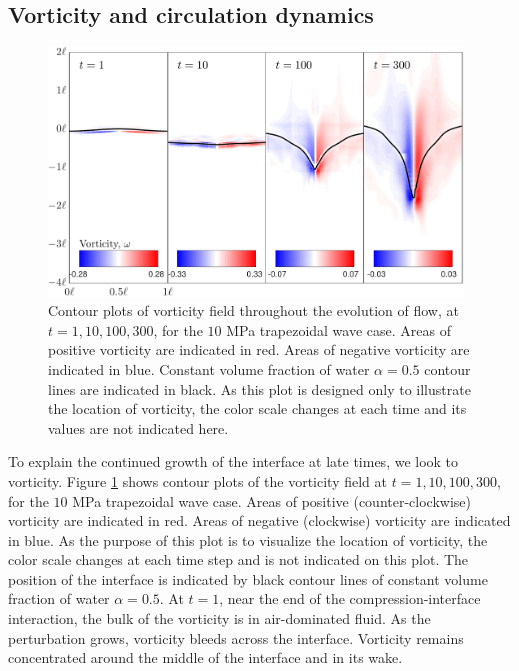 \subsection{Vorticity and circulation dynamics}
\begin{figure}[h] 
  \centering
  \includegraphics[width=0.98\textwidth]{./figs/lung_figs/vorticity_snapshot_mat}
  \caption[The evolution of the vorticity] {Contour plots of vorticity
    field throughout the evolution of flow, at $t=1, 10, 100, 300$,
    for the $10$ MPa trapezoidal wave case. Areas of positive
    vorticity are indicated in red. Areas of negative vorticity are
    indicated in blue. Constant volume fraction of water $\alpha=0.5$
    contour lines are indicated in black. As this plot is designed
    only to illustrate the location of vorticity, the color scale
    changes at each time and its values are not indicated here.}
  \label{fig:vorticity_snapshots}
\end{figure}
% 
To explain the continued growth of the interface at late times, we
look to vorticity. Figure \ref{fig:vorticity_snapshots} shows
contour plots of the vorticity field at $t=1, 10, 100, 300$, for the
$10$ MPa trapezoidal wave case. Areas of positive (counter-clockwise)
vorticity are indicated in red. Areas of negative (clockwise)
vorticity are indicated in blue. As the purpose of this plot is to
visualize the location of vorticity, the color scale changes at each
time step and is not indicated on this plot. The position of the
interface is indicated by black contour lines of constant volume
fraction of water $\alpha=0.5$. At $t=1$, near the end of the
compression-interface interaction, the bulk of the vorticity is in
air-dominated fluid. As the perturbation grows, vorticity bleeds
across the interface. Vorticity remains concentrated around the middle
of the interface and in its wake.

